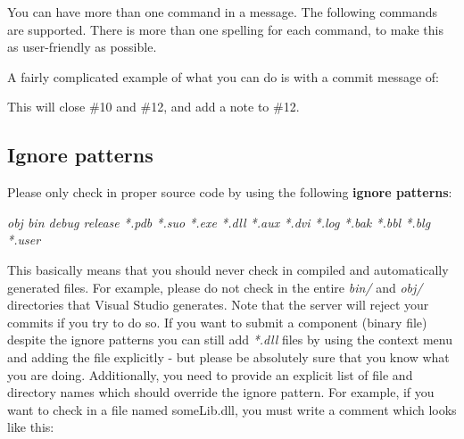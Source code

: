 You can have more than one command in a message. The following commands are supported. There is more than one spelling for each command, to make this as user-friendly as possible.

\begin{center}
\end{center}

A fairly complicated example of what you can do is with a commit message of:

\begin{center}
\end{center}

This will close \#10 and \#12, and add a note to \#12.

\subsection{Ignore patterns}
\label{IgnorePatterns}

Please only check in proper source code by using the following \textbf{ignore patterns}:

\begin{center}
\textit{obj bin debug release *.pdb *.suo *.exe *.dll *.aux *.dvi *.log *.bak *.bbl *.blg *.user}
\end{center}

This basically means that you should never check in compiled and automatically generated files. For example, please do not check in the entire \textit{bin/} and \textit{obj/} directories that Visual Studio generates. Note that the server will reject your commits if you try to do so. If you want to submit a component (binary file) despite the ignore patterns you can still add \textit{*.dll} files by using the context menu and adding the file explicitly - but please be absolutely sure that you know what you are doing. Additionally, you need to provide an explicit list of file and directory names which should override the ignore pattern. For example, if you want to check in a file named someLib.dll, you must write a comment which looks like this:

